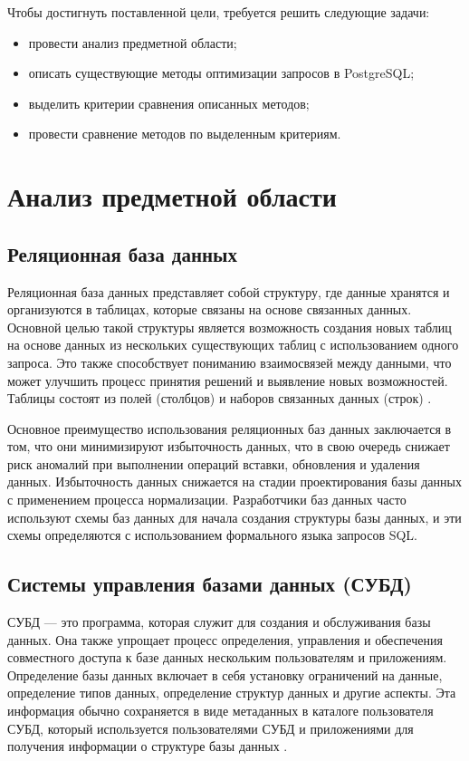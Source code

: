 \documentclass{bmstu}
\begin{document}
Чтобы достигнуть поставленной цели, требуется решить следующие задачи:

\begin{itemize}
	\item провести анализ предметной области;
	\item описать существующие методы оптимизации запросов в PostgreSQL;
	\item выделить критерии сравнения описанных методов;
	\item провести сравнение методов по выделенным критериям.
\end{itemize}

\chapter{Анализ предметной области}

\section{Реляционная база данных}

Реляционная база данных представляет собой структуру, где данные хранятся и организуются в таблицах, которые связаны на основе связанных данных. Основной целью такой структуры является возможность создания новых таблиц на основе данных из нескольких существующих таблиц с использованием одного запроса. Это также способствует пониманию взаимосвязей между данными, что может улучшить процесс принятия решений и выявление новых возможностей. Таблицы состоят из полей (столбцов) и наборов связанных данных (строк) \cite{secondOptSQL}.

Основное преимущество использования реляционных баз данных заключается в том, что они минимизируют избыточность данных, что в свою очередь снижает риск аномалий при выполнении операций вставки, обновления и удаления данных. Избыточность данных снижается на стадии проектирования базы данных с применением процесса нормализации. Разработчики баз данных часто используют схемы баз данных для начала создания структуры базы данных, и эти схемы определяются с использованием формального языка запросов SQL.

\section{Системы управления базами данных (СУБД)}

СУБД --- это программа, которая служит для создания и обслуживания базы данных. Она также упрощает процесс определения, управления и обеспечения совместного доступа к базе данных нескольким пользователям и приложениям. Определение базы данных включает в себя установку ограничений на данные, определение типов данных, определение структур данных и другие аспекты. Эта информация обычно сохраняется в виде метаданных в каталоге пользователя СУБД, который используется пользователями СУБД и приложениями для получения информации о структуре базы данных \cite{fourthOptSQL}.
\end{document}

